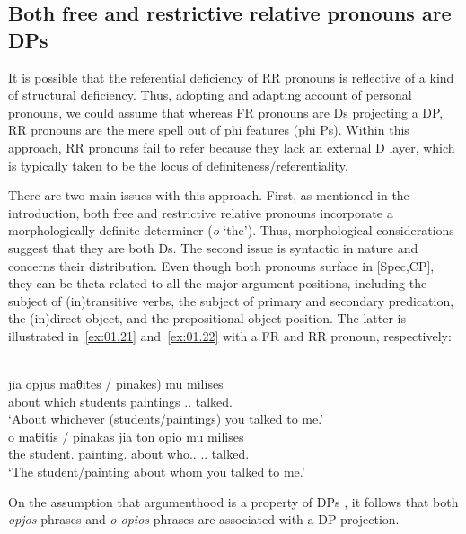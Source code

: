 \documentclass[output=paper]{langsci/langscibook}
\begin{document}
\subsection{Both free and restrictive relative pronouns are DPs}\label{sub:01.4.1}

It is possible that the referential deficiency of \gls{RR} pronouns is reflective of a kind of
structural deficiency. Thus, adopting and adapting  account
of personal pronouns, we could assume that whereas \gls{FR} pronouns are Ds
projecting a DP, \gls{RR} pronouns are the mere spell out of phi features (phi Ps).
Within this approach, \gls{RR} pronouns fail to refer because they lack an external D layer, which
is typically taken to be the locus of definiteness/referentiality.

There are two main issues with this approach. First, as mentioned in the
introduction, both free and restrictive relative pronouns incorporate a
morphologically definite determiner (\emph{o} ‘the’). Thus, morphological
considerations suggest that they are both Ds. The second issue is syntactic in
nature and concerns their distribution. Even though both pronouns surface in
[Spec,CP], they can be theta related to all the major argument positions,
including the subject of (in)transitive verbs, the subject of primary and
secondary predication, the (in)direct object, and the prepositional object
position. The latter is illustrated in~\eqref{ex:01.21}
and~\eqref{ex:01.22} with a \gls{FR} and \gls{RR} pronoun, respectively:

\ea {}\label{ex:01.21}\\
    \gll jia opjus \llap{(}maθites / pinakes) mu milises\\
        about which students {} paintings \Cl.\Fsg.\Gen{} talked.\Ssg{}\\
	\glt \enquote*{About whichever (students/paintings) you talked to me.}
\ex {}\label{ex:01.22}\\
	\gll o maθitis / pinakas jia {ton opio} mu milises\\
        the student.\Nom{} {} painting.\Nom{} about who.\Pl.\Acc{} \Cl.\Fsg.\Gen{} talked.\Ssg{}\\
	\glt \enquote*{The student/painting about whom you talked to me.}
\z

On the assumption that argumenthood is a property of DPs
\citep{Longobardi1994}, it follows that both \emph{opjos}-phrases and
\emph{o opios} phrases are associated with a DP projection.
\end{document}
